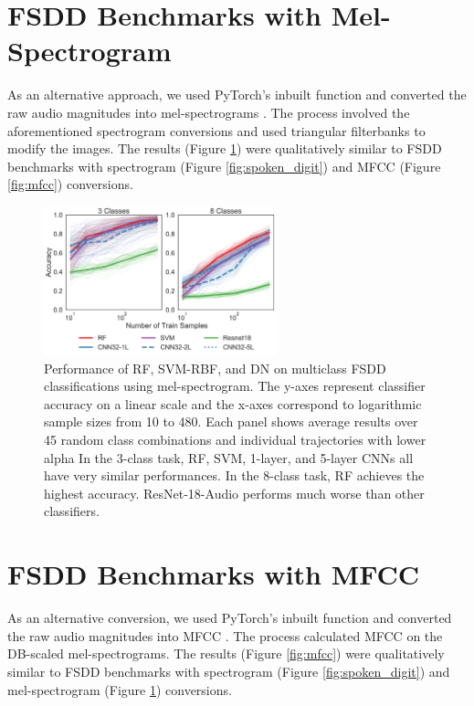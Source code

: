 \section{FSDD Benchmarks with Mel-Spectrogram}
\label{mel}
As an alternative approach, we used PyTorch’s inbuilt function and converted the raw audio magnitudes into mel-spectrograms \citep{pytorch}. The process involved the aforementioned spectrogram conversions and used triangular filterbanks to modify the images. The results (Figure \ref{fig:mel}) were qualitatively similar to FSDD benchmarks with spectrogram (Figure \ref{fig:spoken_digit}) and MFCC (Figure \ref{fig:mfcc}) conversions.

\begin{figure}[!htb]
\centering
\includegraphics[width=0.6\textwidth]{figures/mel.pdf}
  \caption{Performance of RF, SVM-RBF, and DN on multiclass FSDD classifications using mel-spectrogram.
  The y-axes represent classifier accuracy on a linear scale and the x-axes correspond to logarithmic sample sizes from 10 to 480. Each panel shows average results over 45 random class combinations and individual trajectories with lower alpha
  In the 3-class task, RF, SVM, 1-layer, and 5-layer CNNs all have very similar performances. In the 8-class task, RF achieves the highest accuracy. ResNet-18-Audio performs much worse than other classifiers.
  }
\label{fig:mel}
\end{figure}
\vfil\eject

\section{FSDD Benchmarks with MFCC}
\label{mfcc}
As an alternative conversion, we used PyTorch’s inbuilt function and converted the raw audio magnitudes into MFCC \citep{pytorch}. The process calculated MFCC on the DB-scaled mel-spectrograms. The results (Figure \ref{fig:mfcc}) were qualitatively similar to FSDD benchmarks with spectrogram (Figure \ref{fig:spoken_digit}) and mel-spectrogram (Figure \ref{fig:mel}) conversions.

